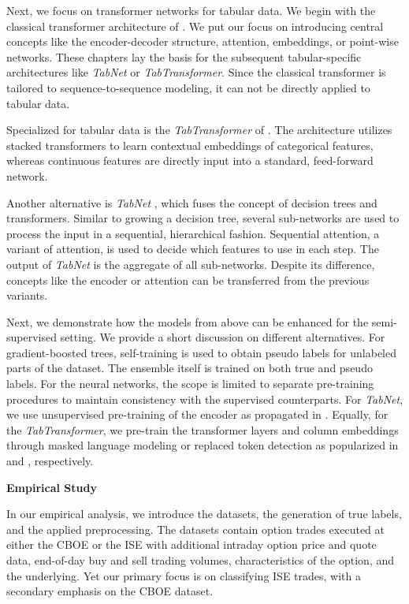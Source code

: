 Next, we focus on transformer networks for tabular data. We begin with the classical transformer architecture of \textcite{vaswaniAttentionAllYou2017}. We put our focus on introducing central concepts like the encoder-decoder structure, attention, embeddings, or point-wise networks. These chapters lay the basis for the subsequent tabular-specific architectures like \emph{TabNet} or \emph{TabTransformer}. Since the classical transformer is tailored to sequence-to-sequence modeling, it can not be directly applied to tabular data.

Specialized for tabular data is the \emph{TabTransformer} of \textcite{huangTabTransformerTabularData2020}. The architecture utilizes stacked transformers to learn contextual embeddings of categorical features, whereas continuous features are directly input into a standard, feed-forward network.

Another alternative is \emph{TabNet} \autocite{arikTabNetAttentiveInterpretable2020}, which fuses the concept of decision trees and transformers. Similar to growing a decision tree, several sub-networks are used to process the input in a sequential, hierarchical fashion. Sequential attention, a variant of attention, is used to decide which features to use in each step. The output of \emph{TabNet} is the aggregate of all sub-networks. Despite its difference, concepts like the encoder or attention can be transferred from the previous variants. 

Next, we demonstrate how the models from above can be enhanced for the semi-supervised setting. We provide a short discussion on different alternatives. For gradient-boosted trees, self-training \autocite{yarowskyUnsupervisedWordSense1995} is used to obtain pseudo labels for unlabeled parts of the dataset. The ensemble itself is trained on both true and pseudo labels. For the neural networks, the scope is limited to separate pre-training procedures to maintain consistency with the supervised counterparts. For \emph{TabNet}, we use unsupervised pre-training of the encoder as propagated in \textcite{arikTabNetAttentiveInterpretable2020}. Equally, for the \emph{TabTransformer}, we pre-train the transformer layers and column embeddings through masked language modeling or replaced token detection as popularized in \textcite{devlinBERTPretrainingDeep2019} and \textcite{clarkELECTRAPretrainingText2020}, respectively. 

\textbf{Empirical Study}

In our empirical analysis, we introduce the datasets, the generation of true labels, and the applied preprocessing. The datasets contain option trades executed at either the \gls{CBOE} or the \gls{ISE} with additional intraday option price and quote data, end-of-day buy and sell trading volumes, characteristics of the option, and the underlying. Yet our primary focus is on classifying \gls{ISE} trades, with a secondary emphasis on the \gls{CBOE} dataset. 

